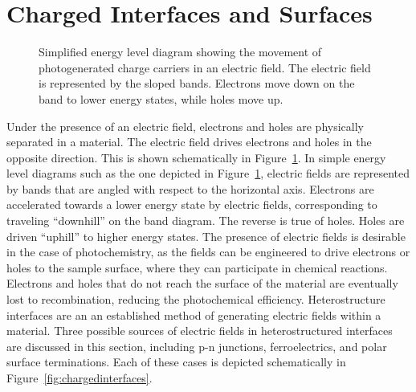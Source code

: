 \documentclass[12pt,%
              twoside,
               letterpaper]{uiothesis}
\begin{document}
\section{Charged Interfaces and Surfaces}
\label{sec:background.charged}

\begin{figure}
\begin{center}
\caption[Movement of photogenerated charge carriers]{%
	Simplified energy level diagram showing the movement of photogenerated charge carriers
in an electric field. The electric field is represented by the sloped bands. Electrons
move down on the band to lower energy states, while holes move up.}
\label{fig:electronholemovement}
\end{center}
\end{figure}


Under the presence of an electric field, electrons and holes are physically separated in a
material. The electric field drives electrons and holes in the opposite direction. This is
shown schematically in Figure~\ref{fig:electronholemovement}. In simple energy level diagrams
such as the one depicted in Figure~\ref{fig:electronholemovement}, electric fields are
represented by bands that are angled with respect to the horizontal axis. Electrons are
accelerated towards a lower energy state by electric fields, corresponding to traveling
``downhill'' on the band diagram. The reverse is true of holes. Holes are driven
``uphill'' to higher energy states. The presence of electric fields is desirable in the
case of photochemistry, as the fields can be engineered to drive electrons or holes to the
sample surface, where they can participate in chemical reactions. Electrons and holes that
do not reach the surface of the material are eventually lost to recombination, reducing
the photochemical efficiency. Heterostructure interfaces are an an established method of
generating electric fields within a material. Three possible sources of electric fields in
heterostructured interfaces are discussed in this section, including p-n junctions,
ferroelectrics, and polar surface terminations. Each of these cases is depicted
schematically in Figure~\ref{fig:chargedinterfaces}. 
\end{document}
